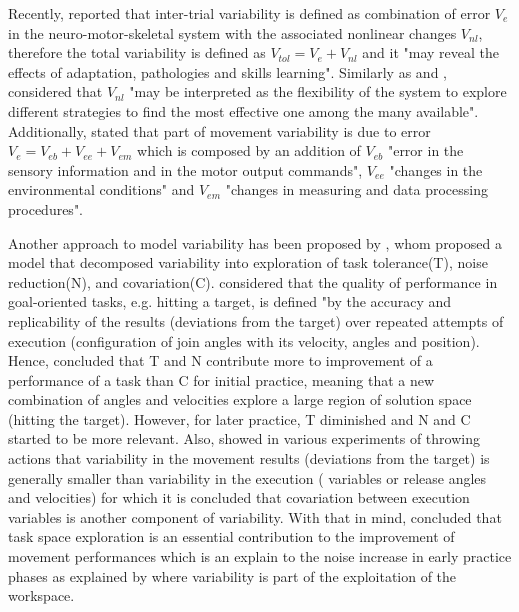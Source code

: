Recently, \cite{preatoni2007, preatoni2010, preatoni2013} reported 
that inter-trial variability is 
defined as combination of error $V_e$ in the neuro-motor-skeletal system with 
the associated nonlinear changes $V_{nl}$, therefore the total variability is 
defined as $V_{tol}=V_e+V_{nl}$ and it  "may reveal the effects of adaptation, 
pathologies and skills learning".
Similarly as \cite{hatze1986} and  \cite{wu2014, herzfeld2014},
\cite{preatoni2013} considered that $V_{nl}$ "may be interpreted
as the flexibility of the system to explore different strategies 
to find the most effective one among the many available".
Additionally, \cite{preatoni2013} stated that part of movement variability 
is due to error $V_{e}=V_{eb}+V_{ee}+V_{em}$ which is composed by an addition of 
$V_{eb}$ "error in the sensory information and in the motor output commands",
$V_{ee}$ "changes in the environmental conditions" and 
$V_{em}$ "changes in measuring and data processing procedures".

Another approach to model variability has been proposed by \cite{muller2004},
whom proposed a model that decomposed variability into exploration of 
task tolerance(T), noise reduction(N), and covariation(C).
\cite{muller2004} considered that the quality of performance in goal-oriented tasks, 
e.g. hitting a target, is defined "by the accuracy and replicability of the 
results (deviations from the target) over repeated attempts of execution 
(configuration of join angles with its velocity, angles and position). 
Hence, \cite{muller2004} concluded that T and N contribute more to improvement of a 
performance of a task than C for initial practice, 
meaning that a new combination of angles and velocities explore a 
large region of solution space (hitting the target).
However, for later practice, T diminished  and N and C started to 
be more relevant.
Also, \cite{muller2004} showed in various experiments of throwing actions
that variability in the movement results (deviations from the target) 
is generally smaller than variability in the execution
( variables or release angles and velocities) for which 
it is concluded that covariation between execution variables
is another component of variability.
With that in mind, \cite{muller2004} concluded that task space exploration 
is an essential  contribution to the improvement of movement performances
which is an explain to the noise increase in early practice phases
as explained by \cite{newell1993} 
where variability is part of the exploitation of the workspace.

